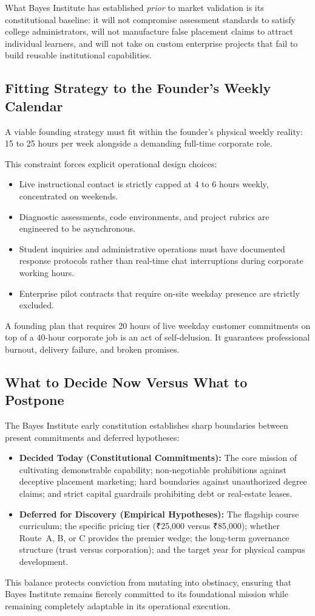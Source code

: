 What Bayes Institute has established \textit{prior} to market validation is its constitutional baseline: it will not compromise assessment standards to satisfy college administrators, will not manufacture false placement claims to attract individual learners, and will not take on custom enterprise projects that fail to build reusable institutional capabilities.

\subsection{Fitting Strategy to the Founder's Weekly Calendar}

A viable founding strategy must fit within the founder's physical weekly reality: 15 to 25 hours per week alongside a demanding full-time corporate role.

This constraint forces explicit operational design choices:

\begin{itemize}[leftmargin=11pt,itemsep=1.5pt,topsep=1.5pt,parsep=0pt]
  \item Live instructional contact is strictly capped at 4 to 6 hours weekly, concentrated on weekends.
  \item Diagnostic assessments, code environments, and project rubrics are engineered to be asynchronous.
  \item Student inquiries and administrative operations must have documented response protocols rather than real-time chat interruptions during corporate working hours.
  \item Enterprise pilot contracts that require on-site weekday presence are strictly excluded.
\end{itemize}

A founding plan that requires 20 hours of live weekday customer commitments on top of a 40-hour corporate job is an act of self-delusion. It guarantees professional burnout, delivery failure, and broken promises.

\subsection{What to Decide Now Versus What to Postpone}

The Bayes Institute early constitution establishes sharp boundaries between present commitments and deferred hypotheses:

\begin{itemize}[leftmargin=11pt,itemsep=2pt,topsep=1.5pt,parsep=0pt]
  \item \textbf{Decided Today (Constitutional Commitments):} The core mission of cultivating demonstrable capability; non-negotiable prohibitions against deceptive placement marketing; hard boundaries against unauthorized degree claims; and strict capital guardrails prohibiting debt or real-estate leases.
  \item \textbf{Deferred for Discovery (Empirical Hypotheses):} The flagship course curriculum; the specific pricing tier (₹25,000 versus ₹85,000); whether Route~A, B, or C provides the premier wedge; the long-term governance structure (trust versus corporation); and the target year for physical campus development.
\end{itemize}

This balance protects conviction from mutating into obstinacy, ensuring that Bayes Institute remains fiercely committed to its foundational mission while remaining completely adaptable in its operational execution.
